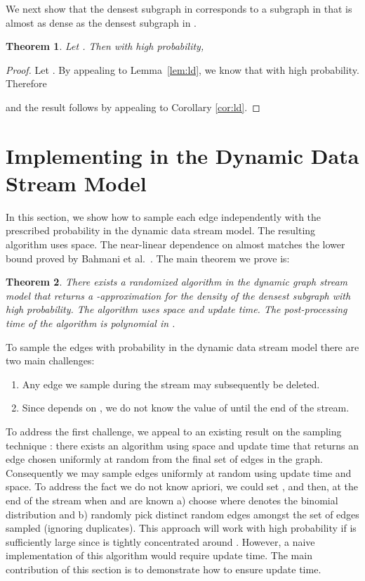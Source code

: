 \documentclass[11pt]{article}
\newtheorem{theorem}{Theorem}\newtheorem{definition}[theorem]{Definition}
\begin{document}
We next show that the densest subgraph in  corresponds to a subgraph in  that is almost as dense as the densest subgraph in .

\begin{theorem}
Let . Then with high probability, 

\end{theorem}
\begin{proof}
Let . By appealing to Lemma~\ref{lem:ld}, we know that  with high probability. Therefore 

and the result follows by appealing to Corollary \ref{cor:ld}.
\end{proof}

\section{Implementing in the Dynamic Data Stream Model}\label{sec:streamalg}

In this section, we show how to sample each edge independently with the prescribed probability in the dynamic data stream model. The resulting algorithm  uses  space. The near-linear dependence on  almost matches the  lower bound proved by Bahmani  et al.~\cite{BahmaniKV12}. The main theorem we prove is:

\begin{theorem}\label{thm:bigthm}
There exists a randomized algorithm in the dynamic graph stream model that returns a -approximation for the density of the densest subgraph with high probability. The algorithm uses  space and  update time. The post-processing time of the algorithm is polynomial in .
\end{theorem}

To sample the edges with probability  in the dynamic data stream model there are two main challenges: 
\begin{enumerate}
\item Any edge we sample during the stream may subsequently be deleted. 
\item Since  depends on , we do not know the value of  until the end of the stream. 
\end{enumerate}
To address the first challenge, we appeal to an existing result on the  sampling technique \cite{JowhariST11}: there exists an algorithm using  space and update time that returns an edge chosen uniformly at random from the final set of edges in the graph. Consequently we may sample  edges uniformly at random using  update time and space. To address the fact we do not know  apriori, we could set , and then, at the end of the stream when  and  are known a) choose  where   denotes the binomial distribution and b) randomly pick  distinct random edges amongst  the set of  edges sampled (ignoring duplicates). This approach will work with high probability if  is sufficiently large since  is tightly concentrated around .
However, a naive implementation of this algorithm would require  update time. The main contribution of this section is to demonstrate how to ensure  update time.
\end{document}
